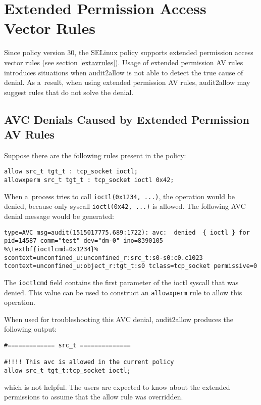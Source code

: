 \section{Extended Permission Access Vector Rules}
Since policy version 30, the SELinux policy supports extended permission access
vector rules (see section \ref{extavrules}). Usage of extended permission AV
rules introduces situations when audit2allow is not able to detect the true
cause of denial. As a~result, when using extended permission AV rules,
audit2allow may suggest rules that do not solve the denial.

\subsection{AVC Denials Caused by Extended Permission AV Rules}
Suppose there are the following rules present in the policy:
\begin{lstlisting}
allow src_t tgt_t : tcp_socket ioctl;
allowxperm src_t tgt_t : tcp_socket ioctl 0x42;
\end{lstlisting}
When a~process tries to call \texttt{ioctl(0x1234, ...)}, the operation would be
denied, because only syscall \texttt{ioctl(0x42, ...)} is allowed. The following
AVC denial message would be generated:
\begin{lstlisting}[escapechar=\%]
type=AVC msg=audit(1515017775.689:1722): avc:  denied  { ioctl } for
pid=14587 comm="test" dev="dm-0" ino=8390105 %\textbf{ioctlcmd=0x1234}%
scontext=unconfined_u:unconfined_r:src_t:s0-s0:c0.c1023
tcontext=unconfined_u:object_r:tgt_t:s0 tclass=tcp_socket permissive=0
\end{lstlisting}
The \texttt{ioctlcmd} field contains the first parameter of the ioctl syscall
that was denied. This value can be used to construct an \texttt{allowxperm} rule
to allow this operation.

\pagebreak

When used for troubleshooting this AVC denial, audit2allow produces the
following output:
\begin{lstlisting}
#============= src_t ==============

#!!!! This avc is allowed in the current policy
allow src_t tgt_t:tcp_socket ioctl;
\end{lstlisting}
which is not helpful. The users are expected to know about the extended
permissions to assume that the allow rule was overridden.

